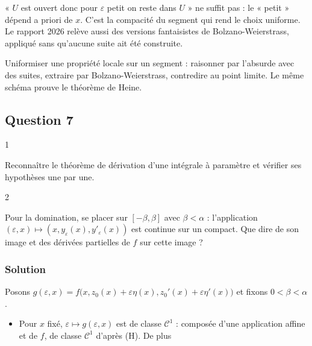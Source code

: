\documentclass[11pt,a4paper]{article}
\providecommand{\tightlist}{\setlength{\itemsep}{0pt}\setlength{\parskip}{0pt}}
\begin{document}
\begin{piege}

« \(U\) est ouvert donc pour \(\varepsilon\) petit on reste dans \(U\) » ne suffit pas : le « petit » dépend a priori de \(x\). C'est la compacité du segment qui rend le choix uniforme. Le rapport 2026 relève aussi des versions fantaisistes de Bolzano-Weierstrass, appliqué sans qu'aucune suite ait été construite.

\end{piege}

\begin{methode}

Uniformiser une propriété locale sur un segment : raisonner par l'absurde avec des suites, extraire par Bolzano-Weierstrass, contredire au point limite. Le même schéma prouve le théorème de Heine.

\end{methode}

\hypertarget{question-7}{%
\subsection{Question 7}\label{question-7}}

\begin{indication}{1}

Reconnaître le théorème de dérivation d'une intégrale à paramètre et vérifier ses hypothèses une par une.

\end{indication}

\begin{indication}{2}

Pour la domination, se placer sur \([-\beta,\beta]\) avec \(\beta<\alpha\) : l'application \((\varepsilon,x)\mapsto(x,y_\varepsilon(x),y'_\varepsilon(x))\) est continue sur un compact. Que dire de son image et des dérivées partielles de \(f\) sur cette image ?

\end{indication}

\hypertarget{solution-6}{%
\subsubsection{Solution}\label{solution-6}}

Posons \(g(\varepsilon,\allowbreak x)=f\big(x,\allowbreak z_0(x)+\varepsilon\eta(x),\allowbreak z_0'(x)+\varepsilon\eta'(x)\big)\) et fixons \(0<\beta<\alpha\).

\begin{itemize}
\tightlist
\item
  Pour \(x\) fixé, \(\varepsilon\mapsto g(\varepsilon,x)\) est de classe \(\mathcal C^1\) : composée d'une application affine et de \(f\), de classe \(\mathcal C^1\) d'après (H). De plus
\end{itemize}
\end{document}
